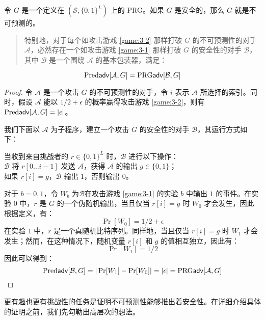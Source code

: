 \begin{theorem}
令 $G$ 是一个定义在 $(\mathcal{S},\{0,1\}^L)$ 上的 PRG。如果 $G$ 是安全的，那么 $G$ 就是不可预测的。
\begin{quote}
特别地，对于每个如攻击游戏 \ref{game:3-2} 那样打破 $G$ 的不可预测性的对手 $\mathcal{A}$，必然存在一个如攻击游戏 \ref{game:3-1} 那样打破 $G$ 的安全性的对手 $\mathcal{B}$，其中 $\mathcal{B}$ 是一个围绕 $\mathcal{A}$ 的基本包装器，满足：
\end{quote}
$$
{\rm Pred\mathsf{adv}}[\mathcal{A},G]={\rm PRG\mathsf{adv}}[\mathcal{B},G]
$$
\end{theorem}

\begin{proof}
令 $\mathcal{A}$ 是一个攻击 $G$ 的不可预测性的对手，令 $i$ 表示 $\mathcal{A}$ 所选择的索引。同时，假设 $\mathcal{A}$ 能以 ${1}/{2}+\epsilon$ 的概率赢得攻击游戏 \ref{game:3-2}，则有${\rm Pred\mathsf{adv}}[\mathcal{A},G]=|\epsilon|$。

我们下面以 $\mathcal{A}$ 为子程序，建立一个攻击 $G$ 的安全性的对手 $\mathcal{B}$，其运行方式如下：

\vspace*{5pt}

\hspace*{5pt} 当收到来自挑战者的 $r\in\{0,1\}^L$ 时，$\mathcal B$ 进行以下操作：\\
\hspace*{50pt} $\mathcal{B}$ 将 $r[0\dots i-1]$ 发送 $\mathcal{A}$，获得 $\mathcal{A}$ 的输出 $g\in\{0,1\}$；\\
\hspace*{50pt} 如果 $r[i]=g$，$\mathcal{B}$ 输出 $1$，否则输出 $0$。

\vspace*{5pt}

对于 $b=0,1$，令 $W_b$ 为$\mathcal{B}$在攻击游戏 \ref{game:3-1} 的实验 $b$ 中输出 $1$ 的事件。在实验 $0$ 中，$r$ 是 $G$ 的一个伪随机输出，当且仅当 $r[i]=g$ 时 $W_0$ 才会发生，因此根据定义，有：
$$
\Pr[W_0]={1}/{2}+\epsilon
$$
在实验 $1$ 中，$r$ 是一个真随机比特序列。同样地，当且仅当 $r[i]=g$ 时 $W_1$ 才会发生；然而，在这种情况下，随机变量 $r[i]$ 和 $g$ 的值相互独立，因此有：
$$
\Pr[W_1]={1}/{2}
$$
因此可以得到：
$$
{\rm Pred\mathsf{adv}}[\mathcal{B},G]=|\Pr[W_1]-\Pr[W_0]|=|\epsilon|={\rm PRG\mathsf{adv}}[\mathcal{A},G]
$$
\end{proof}

更有趣也更有挑战性的任务是证明不可预测性能够推出着安全性。在详细介绍具体的证明之前，我们先勾勒出高层次的想法。

